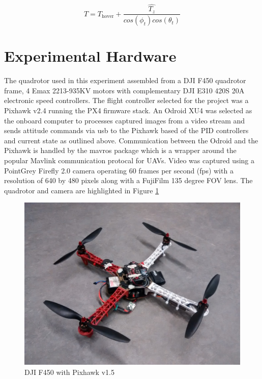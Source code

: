 \documentclass[11pt, twocolumn]{article}
\begin{document}
\begin{equation}
	\label{eq:pid_thrust_adjusted}
	T = 
		T_{\text{hover}} +
		\frac{\hat{T_{z}}}{cos(\phi_t) cos(\theta_t)}
\end{equation}

\section{Experimental Hardware}
The quadrotor used in this experiment assembled from a DJI F450 quadrotor frame, 4 Emax 2213-935KV motors with complementary DJI E310 420S 20A electronic speed controllers. The flight controller selected for the project was a Pixhawk v2.4 running the PX4 firmware stack. An Odroid XU4 was selected as the onboard computer to processes captured images from a video stream and sends attitude commands via usb to the Pixhawk based of the PID controllers and current state as outlined above. Communication between the Odroid and the Pixhawk is handled by the mavros package which is a wrapper around the popular Mavlink communication protocal for UAVs.  Video was captured using a PointGrey Firefly 2.0 camera operating 60 frames per second (fps) with a resolution of 640 by 480 pixels along with a FujiFilm 135 degree FOV lens. The quadrotor and camera are highlighted in Figure \ref{Quadrotor}

\begin{figure}[H]
	\centering
	\includegraphics[width=0.8\linewidth]{images/quadrotor.jpg}
	\caption{DJI F450 with Pixhawk v1.5}
	\label{Quadrotor}
\end{figure}
\end{document}
